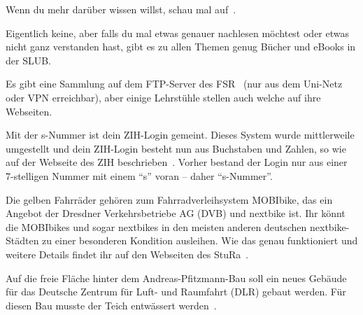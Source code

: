 \label{minisec:faq}
Wenn du mehr darüber wissen willst, schau mal auf~.

Eigentlich keine, aber falls du mal etwas genauer nachlesen möchtest oder etwas nicht ganz verstanden hast, gibt es zu allen Themen genug Bücher und eBooks in der SLUB.~


Es gibt eine Sammlung auf dem FTP-Server des FSR~ (nur aus dem Uni-Netz oder VPN erreichbar), aber einige Lehrstühle stellen auch welche auf ihre Webseiten.

Mit der s-Nummer ist dein ZIH-Login gemeint. Dieses System wurde mittlerweile umgestellt und dein ZIH-Login besteht nun aus Buchstaben und Zahlen, so wie auf der Webseite des ZIH beschrieben~. Vorher bestand der Login nur aus einer 7-stelligen Nummer mit einem \enquote{s} voran -- daher \enquote{s-Nummer}.

Die gelben Fahrräder gehören zum Fahrradverleihsystem MOBIbike, das ein Angebot der Dresdner Verkehrsbetriebe AG (DVB) und nextbike ist. Ihr könnt die MOBIbikes und sogar nextbikes in den meisten anderen deutschen nextbike-Städten zu einer besonderen Kondition ausleihen. Wie das genau funktioniert und weitere Details findet ihr auf den Webseiten des StuRa~.

Auf die freie Fläche hinter dem Andreas-Pfitzmann-Bau soll ein neues Gebäude für das Deutsche Zentrum für Luft- und Raumfahrt (DLR) gebaut werden. Für diesen Bau musste der Teich entwässert werden~.
